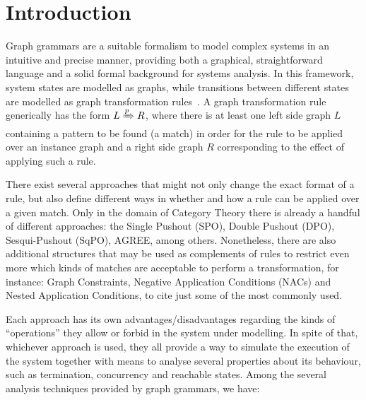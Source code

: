 \chapter{Introduction}

Graph grammars are a suitable formalism to model complex systems in an intuitive and precise manner, providing both a graphical, straightforward language and a solid formal background for systems analysis. In this framework, system states are modelled as graphs, while transitions between different states are modelled as graph transformation rules~\cite{Ehrig2006}. A graph transformation rule generically has the form $L \xRightarrow{p} R$, where there is at least one left side graph $L$ containing a pattern to be found (a match) in order for the rule to be applied over an instance graph and a right side graph $R$ corresponding to the effect of applying such a rule.

There exist several approaches that might not only change the exact format of a rule, but also define different ways in whether and how a rule can be applied over a given match. Only in the domain of Category Theory there is already a handful of different approaches: the Single Pushout (SPO), Double Pushout (DPO), Sesqui-Pushout (SqPO), AGREE, among others. Nonetheless, there are also additional structures that may be used as complements of rules to restrict even more which kinds of matches are acceptable to perform a transformation, for instance: Graph Constraints, Negative Application Conditions (NACs) and Nested Application Conditions, to cite just some of the most commonly used.

Each approach has its own advantages/disadvantages regarding the kinds of  ``operations'' they allow or forbid in the system under modelling. In spite of that, whichever approach is used, they all provide a way to simulate the execution of the system together with means to analyse several properties about its behaviour, such as termination, concurrency and reachable states. Among the several analysis techniques provided by graph grammars, we have:

